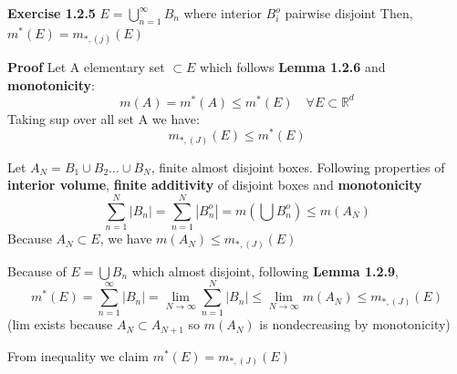 \textbf{Exercise 1.2.5} $E = \bigcup_{n=1}^\infty B_n$ where interior $B_i^o$ pairwise disjoint
Then, 
$m^*(E) = m_{*,(j)}(E)$

\textbf{Proof}
Let A elementary set $\subset E$ which follows \textbf{Lemma 1.2.6} and \textbf{monotonicity}:
\[
m(A)  = m^*(A) \le m^*(E) \quad \forall E  \subset \mathbb{R}^d
\]
Taking sup over all set A we have:
\[
m_{*, (J)} (E) \le m^* (E)
\]

Let $A_N = B_1 \cup B_2 \dots \cup B_N$, finite almost disjoint boxes.
Following properties of \textbf{interior volume}, \textbf{finite additivity} of disjoint boxes and \textbf{monotonicity} 
\[
\sum_{n=1 }^N |B_n| = \sum_{n=1}^N |B_n^o| = m (\bigcup B_n^o) \le  m(A_N)
\]
Because $A_N \subset E$, we have $m(A_N) \le m_{*, (J)} (E)$

Because of $E = \bigcup B_n$ which almost disjoint, following \textbf{Lemma 1.2.9}, 
\[
m^*(E) = \sum_{n=1}^\infty |B_n| = \lim_{N\rightarrow \infty} \sum_{n=1}^{N} |B_n| \le \lim_{N \rightarrow \infty} m(A_N) \le m_{*,(J)}(E)
\]
(lim exists because $A_N \subset A_{N+1}$ so $m(A_N)$ is nondecreasing by monotonicity)

From inequality we claim $m^*(E) = m_{*, (J)}(E)$
